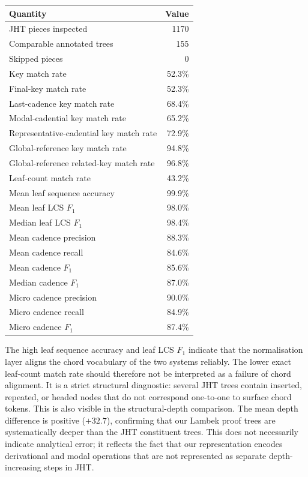 \begin{center}
\begin{tabular}{lr}
\hline
Quantity & Value \\
\hline
JHT pieces inspected & 1170 \\
Comparable annotated trees & 155 \\
Skipped pieces & 0 \\
Key match rate & 52.3\% \\
Final-key match rate & 52.3\% \\
Last-cadence key match rate & 68.4\% \\
Modal-cadential key match rate & 65.2\% \\
Representative-cadential key match rate & 72.9\% \\
Global-reference key match rate & 94.8\% \\
Global-reference related-key match rate & 96.8\% \\
Leaf-count match rate & 43.2\% \\
Mean leaf sequence accuracy & 99.9\% \\
Mean leaf LCS $F_1$ & 98.0\% \\
Median leaf LCS $F_1$ & 98.4\% \\
Mean cadence precision & 88.3\% \\
Mean cadence recall & 84.6\% \\
Mean cadence $F_1$ & 85.6\% \\
Median cadence $F_1$ & 87.0\% \\
Micro cadence precision & 90.0\% \\
Micro cadence recall & 84.9\% \\
Micro cadence $F_1$ & 87.4\% \\
\hline
\end{tabular}
\end{center}

The high leaf sequence accuracy and leaf LCS $F_1$ indicate that the
normalisation layer aligns the chord vocabulary of the two systems reliably.
The lower exact leaf-count match rate should therefore not be interpreted as a
failure of chord alignment. It is a strict structural diagnostic: several JHT
trees contain inserted, repeated, or headed nodes that do not correspond
one-to-one to surface chord tokens. This is also visible in the
structural-depth comparison. The mean depth difference is positive ($+32.7$),
confirming that our Lambek proof trees are systematically deeper than the JHT
constituent trees. This does not necessarily indicate analytical error; it
reflects the fact that our representation encodes derivational and modal
operations that are not represented as separate depth-increasing steps in JHT.


